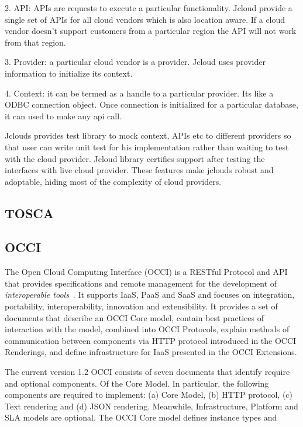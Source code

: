      2. API: APIs are requests to execute a particular
        functionality. Jcloud provide a single set of APIs for all
        cloud vendors which is also location aware. If a cloud vendor
        doesn’t support customers from a particular region the API
        will not work from that region.

     3. Provider: a particular cloud vendor is a provider. Jcloud uses
        provider information to initialize its context.

     4. Context: it can be termed as a handle to a particular
        provider. Its like a ODBC connection object. Once connection
        is initialized for a particular database, it can used to make
        any api call.

        Jclouds provides test library to mock context, APIs etc to
        different providers so that user can write unit test for his
        implementation rather than waiting to test with the cloud
        provider. Jcloud library certifies support after testing the
        interfaces with live cloud provider. These features make
        jclouds robust and adoptable, hiding most of the complexity of
        cloud providers.

        \pv

\subsection{TOSCA}


\subsection{OCCI}

The Open Cloud Computing Interface (OCCI) is a RESTful Protocol and
API that provides specifications and remote management for the
development of \textit{interoperable tools}~\cite{www-occi}. It
supports IaaS, PaaS and SaaS and focuses on integration, portability,
interoperability, innovation and extensibility. It provides a set of
documents that describe an OCCI Core model, contain best practices of
interaction with the model, combined into OCCI Protocols, explain
methods of communication between components via HTTP protocol
introduced in the OCCI Renderings, and define infrastructure for IaaS
presented in the OCCI Extensions.

     The current version 1.2 OCCI consists of seven documents that
     identify require and optional components. Of the Core Model.  In
     particular, the following components are required to implement:
     (a) Core Model, (b) HTTP protocol, (c) Text rendering and (d) JSON
     rendering. Meanwhile, Infrastructure, Platform and SLA models are
     optional.  The OCCI Core model defines instance types and

